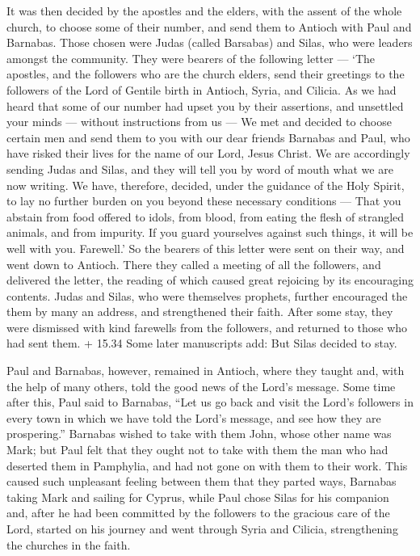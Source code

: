  It was then decided by the apostles and the elders, with
the assent of the whole church, to choose some of their number, and send
them to Antioch with Paul and Barnabas. Those chosen were Judas (called
Barsabas) and Silas, who were leaders amongst the community.
 They were bearers of the following letter --- `The
apostles, and the followers who are the church elders, send their
greetings to the followers of the Lord of Gentile birth in Antioch,
Syria, and Cilicia.  As we had heard that some of our
number had upset you by their assertions, and unsettled your minds ---
without instructions from us ---  We met and decided to
choose certain men and send them to you with our dear friends Barnabas
and Paul,  who have risked their lives for the name of our
Lord, Jesus Christ.  We are accordingly sending Judas and
Silas, and they will tell you by word of mouth what we are now writing.
 We have, therefore, decided, under the guidance of the
Holy Spirit, to lay no further burden on you beyond these necessary
conditions ---  That you abstain from food offered to
idols, from blood, from eating the flesh of strangled animals, and from
impurity. If you guard yourselves against such things, it will be well
with you. Farewell.'  So the bearers of this letter were
sent on their way, and went down to Antioch. There they called a meeting
of all the followers,  and delivered the letter, the
reading of which caused great rejoicing by its encouraging contents.
 Judas and Silas, who were themselves prophets, further
encouraged the them by many an address, and strengthened their faith.
 After some stay, they were dismissed with kind farewells
from the followers, and returned to those who had sent them.
 + 15.34 Some later manuscripts add: But Silas decided to
stay.

 Paul and Barnabas, however, remained in Antioch, where
they taught and, with the help of many others, told the good news of the
Lord's message.  Some time after this, Paul said to
Barnabas, ``Let us go back and visit the Lord's followers in every town
in which we have told the Lord's message, and see how they are
prospering.''  Barnabas wished to take with them John,
whose other name was Mark;  but Paul felt that they ought
not to take with them the man who had deserted them in Pamphylia, and
had not gone on with them to their work.  This caused such
unpleasant feeling between them that they parted ways, Barnabas taking
Mark and sailing for Cyprus,  while Paul chose Silas for
his companion and, after he had been committed by the followers to the
gracious care of the Lord,  started on his journey and went
through Syria and Cilicia, strengthening the churches in the faith.


